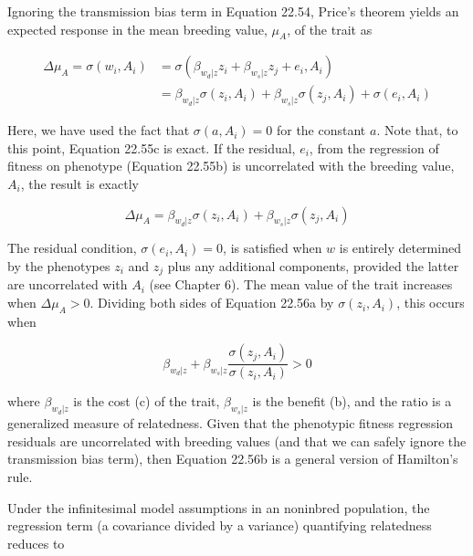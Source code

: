 \documentclass{article}
\begin{document}
Ignoring the transmission bias term in Equation 22.54, Price’s theorem yields an expected response in the mean breeding value,  $ \mu_{A} $, of the trait as

\begin{equation}
\begin{align*}\Delta\mu_{A}=\sigma(w_{i},A_{i})&=\sigma(\beta_{w_{d}|z}z_{i}+\beta_{w_{s}|z}z_{j}+e_{i},A_{i})\\&=\beta_{w_{d}|z}\sigma(z_{i},A_{i})+\beta_{w_{s}|z}\sigma(z_{j},A_{i})+\sigma(e_{i},A_{i})\end{align*}
\tag{22.55c}
\label{eq:22_55c}
\end{equation}

Here, we have used the fact that  $ \sigma(a, A_i) = 0 $ for the constant  $ a $. Note that, to this point, Equation 22.55c is exact. If the residual,  $ e_i $, from the regression of fitness on phenotype (Equation 22.55b) is uncorrelated with the breeding value,  $ A_i $, the result is exactly

\begin{equation}
\Delta\mu_{A}=\beta_{w_{d}|z}\sigma(z_{i},A_{i})+\beta_{w_{s}|z}\sigma(z_{j},A_{i})
\tag{22.56a}
\label{eq:22_56a}
\end{equation}

The residual condition,  $ \sigma(e_i, A_i) = 0 $, is satisfied when  $ w $ is entirely determined by the phenotypes  $ z_i $ and  $ z_j $ plus any additional components, provided the latter are uncorrelated with  $ A_i $ (see Chapter 6). The mean value of the trait increases when  $ \Delta \mu_A > 0 $. Dividing both sides of Equation 22.56a by  $ \sigma(z_i, A_i) $, this occurs when

\begin{equation}
\beta_{w_{d}|z}+\beta_{w_{s}|z}\frac{\sigma(z_{j},A_{i})}{\sigma(z_{i},A_{i})}>0
\tag{22.56b}
\label{eq:22_56b}
\end{equation}

where  $ \beta_{w_d|z} $ is the cost (c) of the trait,  $ \beta_{w_s|z} $ is the benefit (b), and the ratio is a generalized measure of relatedness. Given that the phenotypic fitness regression residuals are uncorrelated with breeding values (and that we can safely ignore the transmission bias term), then Equation 22.56b is a general version of Hamilton's rule.

Under the infinitesimal model assumptions in an noninbred population, the regression term (a covariance divided by a variance) quantifying relatedness reduces to
\end{document}
